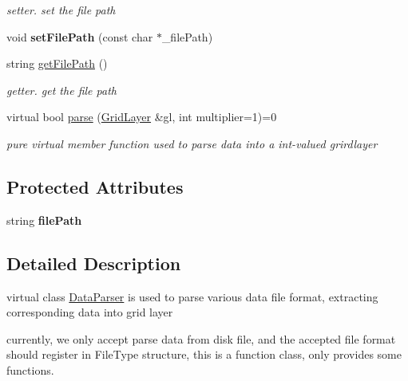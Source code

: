 \begin{DoxyCompactItemize}
\begin{DoxyCompactList}\small\item\em setter. set the file path \end{DoxyCompactList}\item 
\hypertarget{classDataParser_a0e65a165cd0144afe7c5fe68e71e090a}{void {\bfseries set\-File\-Path} (const char $\ast$\-\_\-file\-Path)}\label{classDataParser_a0e65a165cd0144afe7c5fe68e71e090a}

\item 
\hypertarget{classDataParser_aa16dd6e4395db13e1dc7a174a415ebc1}{string \hyperlink{classDataParser_aa16dd6e4395db13e1dc7a174a415ebc1}{get\-File\-Path} ()}\label{classDataParser_aa16dd6e4395db13e1dc7a174a415ebc1}

\begin{DoxyCompactList}\small\item\em getter. get the file path \end{DoxyCompactList}\item 
virtual bool \hyperlink{classDataParser_a45e498627eec0fc8638a34eab2ff2812}{parse} (\hyperlink{classGridLayer}{\-Grid\-Layer} \&gl, int multiplier=1)=0
\begin{DoxyCompactList}\small\item\em pure virtual member function used to parse data into a int-\/valued grirdlayer \end{DoxyCompactList}\end{DoxyCompactItemize}
\subsection*{\-Protected \-Attributes}
\begin{DoxyCompactItemize}
\item 
\hypertarget{classDataParser_a02f3f9f3cca1e56902b98dc2e39c7e22}{string {\bfseries file\-Path}}\label{classDataParser_a02f3f9f3cca1e56902b98dc2e39c7e22}

\end{DoxyCompactItemize}


\subsection{\-Detailed \-Description}
virtual class \hyperlink{classDataParser}{\-Data\-Parser} is used to parse various data file format, extracting corresponding data into grid layer 

currently, we only accept parse data from disk file, and the accepted file format should register in \-File\-Type structure, this is a function class, only provides some functions. 


